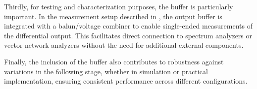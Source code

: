 Thirdly, for testing and characterization purposes, the buffer is particularly important. In the measurement setup described in \cite{Bastos2014}, the output buffer is integrated with a balun/voltage combiner to enable single-ended measurements of the differential output. This facilitates direct connection to spectrum analyzers or vector network analyzers without the need for additional external components.

Finally, the inclusion of the buffer also contributes to robustness against variations in the following stage, whether in simulation or practical implementation, ensuring consistent performance across different configurations.